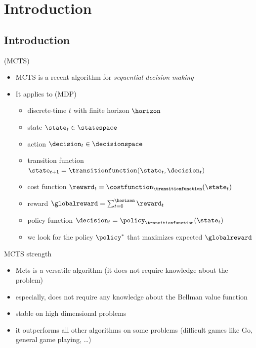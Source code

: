 \section{Introduction}
\subsection{Introduction}

\begin{frame}{\mcts{} (MCTS)}
    \begin{itemize}
        \item MCTS is a recent algorithm for {\em sequential decision making}
        \item It applies to \mdp{} (MDP)
        \begin{itemize}
            \item discrete-time $t$ with finite horizon $\horizon$
            \item state $\state_t \in \statespace$
            \item action $\decision_t \in \decisionspace$
            \item transition function $\state_{t+1} = \transitionfunction(\state_t, \decision_t)$
            \item cost function $\reward_t = \costfunction_\transitionfunction(\state_t)$
            \item reward $\globalreward = \sum_{t = 0}^{\horizon}{\reward_t}$
            \item policy function $\decision_t = \policy_{\transitionfunction}(\state_t)$
            \item we look for the policy $\policy^*$ that maximizes expected $\globalreward$ 
        \end{itemize}
    \end{itemize}
\end{frame}


\begin{frame}{MCTS strength}
    \begin{itemize}
        \item Mcts is a versatile algorithm (it does not require knowledge about the problem)
        \item especially, does not require any knowledge about the Bellman value function
        \item stable on high dimensional problems
        \item it outperforms all other algorithms on some problems (difficult games like Go, general game playing, \dots)
    \end{itemize}
\end{frame}


